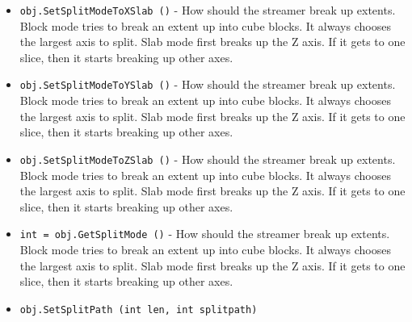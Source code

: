 \begin{itemize}
\item  \verb|obj.SetSplitModeToXSlab ()| -  How should the streamer break up extents. Block mode
 tries to break an extent up into cube blocks.  It always chooses
 the largest axis to split.
 Slab mode first breaks up the Z axis.  If it gets to one slice,
 then it starts breaking up other axes.

\item  \verb|obj.SetSplitModeToYSlab ()| -  How should the streamer break up extents. Block mode
 tries to break an extent up into cube blocks.  It always chooses
 the largest axis to split.
 Slab mode first breaks up the Z axis.  If it gets to one slice,
 then it starts breaking up other axes.

\item  \verb|obj.SetSplitModeToZSlab ()| -  How should the streamer break up extents. Block mode
 tries to break an extent up into cube blocks.  It always chooses
 the largest axis to split.
 Slab mode first breaks up the Z axis.  If it gets to one slice,
 then it starts breaking up other axes.

\item  \verb|int = obj.GetSplitMode ()| -  How should the streamer break up extents. Block mode
 tries to break an extent up into cube blocks.  It always chooses
 the largest axis to split.
 Slab mode first breaks up the Z axis.  If it gets to one slice,
 then it starts breaking up other axes.

\item  \verb|obj.SetSplitPath (int len, int splitpath)|

\end{itemize}
